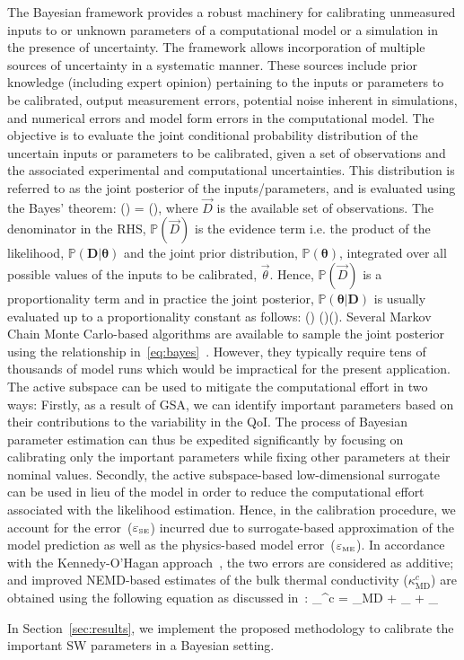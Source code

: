 The Bayesian framework provides a robust machinery for calibrating unmeasured inputs to 
or unknown parameters of a computational model or
a simulation in the presence of uncertainty. The framework allows incorporation of multiple
sources of uncertainty in a systematic manner. These sources include prior knowledge
(including expert opinion)
 pertaining to the inputs or parameters to be calibrated, output measurement errors, potential noise inherent
in simulations, and numerical errors and model form errors in the computational model.
 The objective is to evaluate the joint
conditional probability distribution of the uncertain inputs or parameters to be calibrated,
given a set of observations and the
associated experimental and computational uncertainties. This distribution is referred to as
the joint posterior of the inputs/parameters, and is evaluated using the Bayes' theorem:
%
\be
{}(\bm{\theta}\vert {}) = 
(\bm{\theta}),
\ee
%
where $\vec{D}$ is the available set of observations. 
The denominator in the RHS, $\mathbb{P}(\vec{D})$ is the evidence term i.e. the product of the likelihood, 
$\mathbb{P}(\bm{D}\vert\bm{\theta})$ and the joint prior distribution,
$\mathbb{P}(\bm{\theta})$, integrated over all possible values of the inputs to be calibrated, $\vec{\theta}$. 
Hence, $\mathbb{P}(\vec{D})$ is a proportionality term and in practice the joint posterior, 
$\mathbb{P}(\bm{\theta}\vert \bm{D})$ is usually evaluated up to a proportionality constant as follows:
%
\be
{}(\bm{\theta}\vert {}) \propto
{}(\vert\bm{\theta})(\bm{\theta}).
\label{eq:bayes}
\ee
%
Several Markov Chain Monte Carlo-based algorithms are available to sample the joint posterior
using the relationship in~\eqref{eq:bayes}~\cite{Haario:2001, Haario:2006,Xu:2014}.
However, they typically require tens of thousands of model runs which would be
impractical for the present application. The active subspace can be used to mitigate the
computational effort in two ways: Firstly, as a result of GSA, we can identify important 
parameters based on their contributions to the variability in the QoI. The process of Bayesian
parameter estimation can thus be expedited significantly by focusing on calibrating only the 
important parameters while fixing other parameters at their nominal values. Secondly, 
the active subspace-based low-dimensional surrogate can be used in lieu of the model in
order to reduce the computational effort associated with the
likelihood estimation. Hence, in the calibration procedure, we account for the 
error~($\varepsilon_\text{\tiny{SE}}$)
incurred due to surrogate-based approximation of the model prediction as well as the
physics-based model error~($\varepsilon_\text{\tiny{ME}}$).
In accordance with the Kennedy-O'Hagan approach~\cite{Kennedy:2001}, the two errors
are considered as additive; and improved NEMD-based estimates of the bulk thermal
conductivity ($\kappa_\text{MD}^c$) are obtained using the following equation as discussed
in~\cite{Liang:2011,Nannapaneni:2016}:
%
\be
\kappa_^{c} = \kappa_{\tiny{\mbox{MD}}} + \varepsilon_ + \varepsilon_
\label{eq:kc}
\ee
%

In Section~\ref{sec:results}, we implement the proposed methodology to calibrate the
important SW parameters in a Bayesian setting. 




